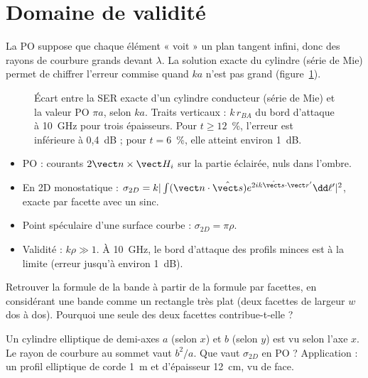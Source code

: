 \section{Domaine de validité}
La PO suppose que chaque élément « voit » un plan tangent infini, donc des rayons de courbure grands devant $\lambda$. La solution exacte du cylindre (série de Mie) permet de chiffrer l'erreur commise quand $ka$ n'est pas grand (figure~\ref{fig:mie}).

\begin{figure}[htbp]
\centering

\caption{Écart entre la SER exacte d'un cylindre conducteur (série de Mie) et la valeur PO $\pi a$, selon $ka$. Traits verticaux : $k\,r_{BA}$ du bord d'attaque à 10~GHz pour trois épaisseurs. Pour $t\ge12$~\%, l'erreur est inférieure à 0,4~dB ; pour $t=6$~\%, elle atteint environ 1~dB.}\label{fig:mie}
\end{figure}

\begin{resultat}
\begin{itemize}
\item PO : courants $2\vect n\times\vect H_i$ sur la partie éclairée, nuls dans l'ombre.
\item En 2D monostatique : $\sigma_{2D}=k|\int(\vect n\cdot\shat)e^{2ik\shat\cdot\vect r'}\dd\ell'|^2$, exacte par facette avec un sinc.
\item Point spéculaire d'une surface courbe : $\sigma_{2D}=\pi\rho$.
\item Validité : $k\rho\gg1$. À 10~GHz, le bord d'attaque des profils minces est à la limite (erreur jusqu'à environ 1~dB).
\end{itemize}
\end{resultat}

\exercices
\begin{exercice}
Retrouver la formule de la bande à partir de la formule par facettes, en considérant une bande comme un rectangle très plat (deux facettes de largeur $w$ dos à dos). Pourquoi une seule des deux facettes contribue-t-elle ?
\end{exercice}
\begin{exercice}
Un cylindre elliptique de demi-axes $a$ (selon $x$) et $b$ (selon $y$) est vu selon l'axe $x$. Le rayon de courbure au sommet vaut $b^2/a$. Que vaut $\sigma_{2D}$ en PO ? Application : un profil elliptique de corde 1~m et d'épaisseur 12~cm, vu de face.
\end{exercice}

